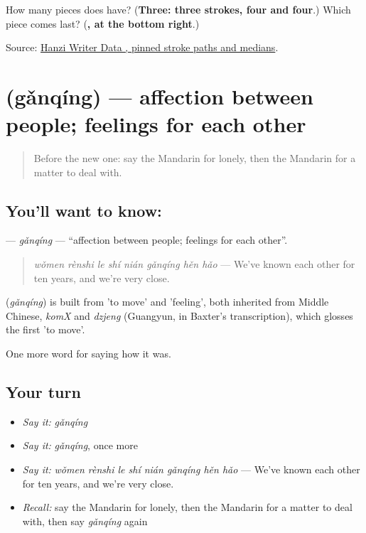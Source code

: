 \begin{tcolorbox}[breakable,colback=teal!4,colframe=teal!35!black,title={Before you move on}]
How many pieces does  have? (\textbf{Three: three strokes, four and four}.) Which piece comes last? (\textbf{, at the bottom right}.)

Source: \href{https://raw.githubusercontent.com/chanind/hanzi-writer-data/68d10a4b21150cae5e1ebbd223eed289cf32d90c/data/\%E6\%83\%85.json}{Hanzi Writer Data , pinned stroke paths and medians}.
\end{tcolorbox}
\section[\texorpdfstring{\zh{感情} (gǎnqíng)}{感情 (gǎnqíng)}]{ (gǎnqíng) — affection between people; feelings for each other}

\label{lesson:ZH-C459-ganqing}



\begin{quote}
Before the new one: say the Mandarin for lonely, then the Mandarin for a matter to deal with.
\end{quote}

\subsection*{You'll want to know: }
\textbf{} — \emph{gǎnqíng} — \textquotedblleft{}affection between people; feelings for each other\textquotedblright{}.

\begin{quote}
\emph{wǒmen rènshi le shí nián gǎnqíng hěn hǎo} — We've known each other for ten years, and we're very close.
\end{quote}

\begin{cousinweb}
\textbf{} (\emph{gǎnqíng}) is built from  'to move' and  'feeling', both inherited from Middle Chinese, \emph{komX} and \emph{dzjeng} (Guangyun, in Baxter's transcription), which glosses the first 'to move'.
\end{cousinweb}

\begin{grammarlens}[title={What you've built}]
One more word for saying how it was.
\end{grammarlens}

\subsection*{Your turn}
\begin{itemize}
\raggedright
  \item \emph{Say it:} \emph{gǎnqíng}
  \item \emph{Say it:} \emph{gǎnqíng}, once more
  \item \emph{Say it:} \emph{wǒmen rènshi le shí nián gǎnqíng hěn hǎo} — We've known each other for ten years, and we're very close.
  \item \emph{Recall:} say the Mandarin for lonely, then the Mandarin for a matter to deal with, then say \emph{gǎnqíng} again
\end{itemize}

